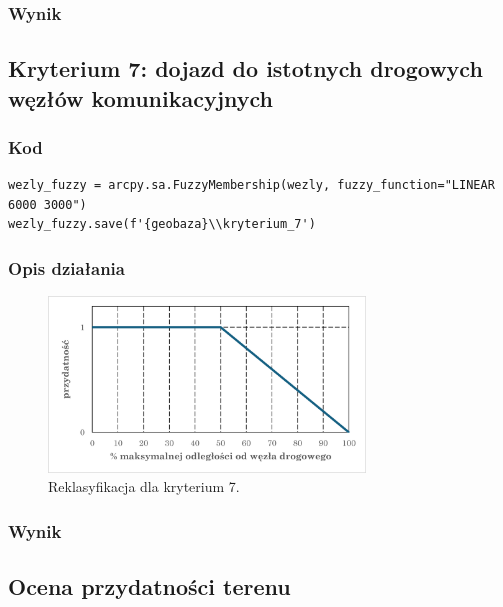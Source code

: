 \documentclass{article}
\begin{document}
\subsubsection{Wynik}
\newpage
\subsection{Kryterium 7: dojazd do istotnych drogowych węzłów komunikacyjnych}
\subsubsection{Kod}
\begin{lstlisting}
wezly_fuzzy = arcpy.sa.FuzzyMembership(wezly, fuzzy_function="LINEAR 6000 3000")
wezly_fuzzy.save(f'{geobaza}\\kryterium_7')
\end{lstlisting}

\subsubsection{Opis działania}
\begin{figure}[H]
    \centering
    \includegraphics[width=0.75\textwidth]{img/kryterium7-wykres-glowny.png}
    \caption*{Reklasyfikacja dla kryterium 7.}
\end{figure}

\subsubsection{Wynik}


\subsection{Ocena przydatności terenu}
\end{document}
